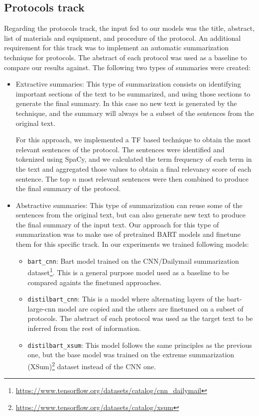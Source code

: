 \documentclass[runningheads]{llncs}
\begin{document}
\subsection{Protocols track}
Regarding the protocols track, the input fed to our models was the title, abstract, list of materials and equipment, and procedure of the protocol. An additional requirement for this track was to implement an automatic summarization technique for protocols. The abstract of each protocol was used as a baseline to compare our results against. The following two types of summaries were created:
\begin{itemize}
	\item Extractive summaries: This type of summarization consists on identifying important sections of the text to be summarized, and using those sections to generate the final summary. In this case no new text is generated by the technique, and the summary will always be a subset of the sentences from the original text.
	
	For this approach, we implemented a TF based technique to obtain the most relevant sentences of the protocol. The sentences were identified and tokenized using SpaCy, and we calculated the term frequency of each term in the text and aggregated those values to obtain a final relevancy score of each sentence. The top $n$ most relevant sentences were then combined to produce the final summary of the protocol.
	
	\item Abstractive summaries: This type of summarization can reuse some of the sentences from the original text, but can also generate new text to produce the final summary of the input text. Our approach for this type of summarization was to make use of pretrained BART \cite{lewis2019bart} models and finetune them for this specific track. In our experiments we trained following models:
		\begin{itemize}
			\item \texttt{bart\_cnn}: Bart model trained on the CNN/Dailymail summarization dataset\footnote{\url{https://www.tensorflow.org/datasets/catalog/cnn_dailymail}}. This is a general purpose model used as a baseline to be compared againts the finetuned approaches.
			\item \texttt{distilbart\_cnn}: This is a model where alternating layers of the bart-large-cnn model are copied and the others are finetuned on a subset of protocols. The abstract of each protocol was used as the target text to be inferred from the rest of information.
			\item \texttt{distilbart\_xsum}: This model follows the same principles as the previous one, but the base model was trained on the extreme summarization (XSum)\footnote{\url{https://www.tensorflow.org/datasets/catalog/xsum}} dataset instead of the CNN one.
		\end{itemize}
\end{itemize}
\end{document}
